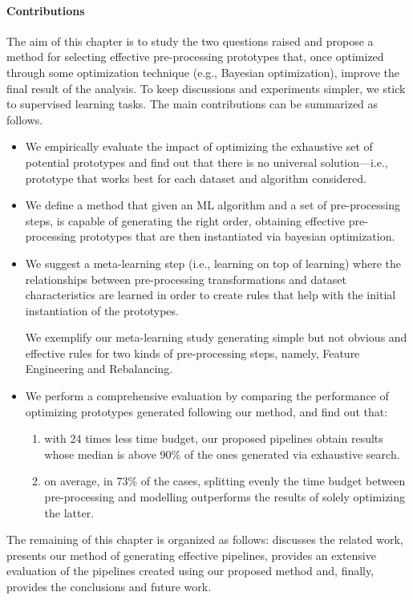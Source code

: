 \paragraph{Contributions} The aim of this chapter is to study the two questions raised and propose a method for selecting effective pre-processing prototypes that, once optimized through some optimization technique (e.g., Bayesian optimization), improve the final result of the analysis.
To keep discussions and experiments simpler, we stick to supervised learning tasks.
The main contributions can be summarized as follows.
\begin{itemize}
    \item We empirically evaluate the impact of optimizing the exhaustive set of potential prototypes and find out that	there is no universal solution---i.e., prototype that works best for each dataset and algorithm considered.
    \item We define a method that given an ML algorithm and a set of pre-processing steps, is capable of generating the right order, obtaining effective pre-processing prototypes that are then instantiated via bayesian optimization.
    \item We suggest a meta-learning step (i.e., learning on top of learning) where the relationships between pre-processing transformations and dataset characteristics are learned in order to create rules that help with the initial instantiation of the prototypes.

	We exemplify our meta-learning study generating simple but not obvious and effective rules for two kinds of pre-processing steps, namely, Feature Engineering and Rebalancing.

    \item We perform a comprehensive evaluation by comparing the performance of optimizing prototypes generated following our method, and find out that:
    \begin{enumerate}
        \item with 24 times less time budget, our proposed pipelines obtain results whose median is above 90\% of the ones generated via exhaustive search.
        \item on average, in 73\% of the cases, splitting evenly the time budget between pre-processing and modelling outperforms the results of solely optimizing the latter.
    \end{enumerate}
\end{itemize}

The remaining of this chapter is organized as follows:
 discusses the related work,
 presents our method of generating effective pipelines,
 provides an extensive evaluation of the pipelines created using our proposed method and, finally,  provides the conclusions and future work.


